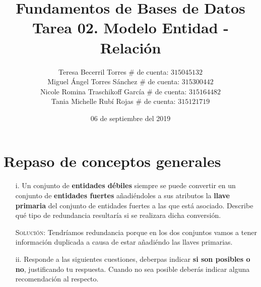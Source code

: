 \documentclass[letterpaper,11pt]{article}
\title{Fundamentos de Bases de Datos \\
       Tarea 02. Modelo Entidad - Relación}
\author{Teresa Becerril Torres
        $\#$ de cuenta: $315045132$ \\
        Miguel Ángel Torres Sánchez
        $\#$ de cuenta: $315300442$ \\
        Nicole Romina Traschikoff García
        $\#$ de cuenta: $315164482$ \\
        Tania Michelle Rubí Rojas
        $\#$ de cuenta: $315121719$}
\date{06 de septiembre del 2019}
\begin{document}
\maketitle

\section{Repaso de conceptos generales}
\begin{itemize}
    \item[i.] Un conjunto de \textbf{entidades débiles} siempre se puede
    convertir en un conjunto de \textbf{entidades fuertes} añadiéndoles a sus
    atributos la \textbf{llave primaria} del conjunto de entidades fuertes a
    las que está asociado. Describe qué tipo de redundancia resultaría si se
    realizara dicha conversión.

    \textsc{Solución:} Tendríamos redundancia porque en los dos conjuntos vamos
    a tener información duplicada a causa de estar añadiéndo las llaves
    primarias.

    \item[ii.] Responde a las siguientes cuestiones, deberpas indicar
    \textbf{si son posibles o no}, justificando tu respuesta. Cuando no sea
    posible deberás indicar alguna recomendación al respecto.


\end{itemize}
\end{document}
